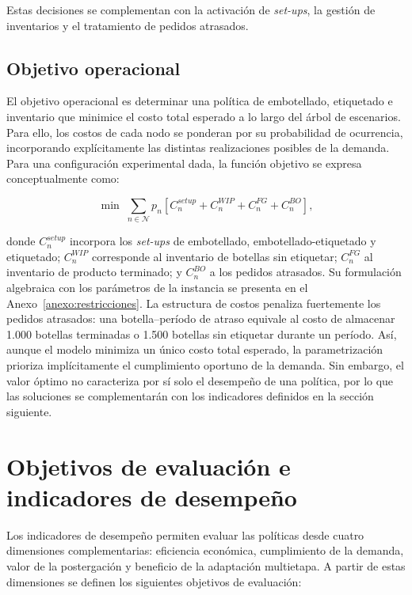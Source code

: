 Estas decisiones se complementan con la activación de \textit{set-ups}, la gestión de inventarios y el tratamiento de pedidos atrasados.

\subsection{Objetivo operacional}

El objetivo operacional es determinar una política de embotellado, etiquetado e inventario que minimice el costo total esperado a lo largo del árbol de escenarios. Para ello, los costos de cada nodo se ponderan por su probabilidad de ocurrencia, incorporando explícitamente las distintas realizaciones posibles de la demanda.
Para una configuración experimental dada, la función objetivo se expresa conceptualmente como:

\begin{equation}
\min \;
\sum_{n\in\mathcal{N}} p_n
\left[
    C^{setup}_n
    +C^{WIP}_n
    +C^{FG}_n
    +C^{BO}_n
\right],
\label{eq:objetivo_esperado}
\end{equation}

donde $C^{setup}_n$ incorpora los \textit{set-ups} de embotellado,
embotellado-etiquetado y etiquetado; $C^{WIP}_n$ corresponde al inventario de
botellas sin etiquetar; $C^{FG}_n$ al inventario de producto terminado; y
$C^{BO}_n$ a los pedidos atrasados. Su formulación algebraica con los
parámetros de la instancia se presenta en el Anexo~\ref{anexo:restricciones}. La estructura de costos penaliza fuertemente los pedidos atrasados: una
botella--período de atraso equivale al costo de almacenar 1.000 botellas terminadas o 1.500 botellas sin etiquetar durante un período. Así, aunque el modelo minimiza un único costo total esperado, la parametrización prioriza implícitamente el cumplimiento oportuno de la demanda. Sin embargo, el valor óptimo no caracteriza por sí solo el desempeño de una política, por lo que las soluciones se complementarán con los indicadores definidos en la sección siguiente.

\section{Objetivos de evaluación e indicadores de desempeño}

Los indicadores de desempeño permiten evaluar las políticas desde cuatro dimensiones complementarias: eficiencia económica, cumplimiento de la demanda, valor de la postergación y beneficio de la adaptación multietapa. A partir de estas dimensiones se definen los siguientes objetivos de evaluación:

